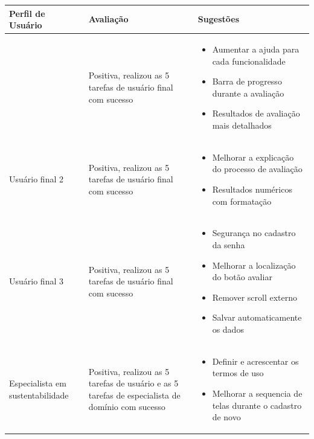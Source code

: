\begin{longtable}{|>{\centering}p{}|>{\centering}p{}|>{\centering}p{}|}
\hline 
\textbf{\small{}Perfil de Usuário} & \textbf{\small{}Avaliação} & \textbf{\small{}Sugestões}\tabularnewline
\hline 
\hline 
{\small{}Usuário final 1} & {\small{}Positiva, realizou as 5 tarefas de usuário final com sucesso} & \begin{itemize}
\item {\small{}Aumentar a ajuda para cada funcionalidade}{\small \par}
\item {\small{}Barra de progresso durante a avaliação}{\small \par}
\item {\small{}Resultados de avaliação mais detalhados}
\end{itemize}
\tabularnewline
\hline 
\hline 
{\small{}Usuário final 2} & {\small{}Positiva, realizou as 5 tarefas de usuário final com sucesso} & \begin{itemize}
\item {\small{}Melhorar a explicação do processo de avaliação}{\small \par}
\item {\small{}Resultados numéricos com formatação }
\end{itemize}
\tabularnewline
\hline 
\hline 
{\small{}Usuário final 3} & {\small{}Positiva, realizou as 5 tarefas de usuário final com sucesso} & \begin{itemize}
\item {\small{}Segurança no cadastro da senha}{\small \par}
\item {\small{}Melhorar a localização do botão avaliar}{\small \par}
\item {\small{}Remover }\foreignlanguage{english}{{\small{}scroll}}{\small{}
externo}{\small \par}
\item {\small{}Salvar automaticamente os dados}
\end{itemize}
\tabularnewline
\hline 
\hline 
{\small{}Especialista em sustentabilidade} & {\small{}Positiva, realizou as 5 tarefas de usuário e as 5 tarefas
de especialista de domínio com sucesso} & \begin{itemize}
\item {\small{}Definir e acrescentar os termos de uso}{\small \par}
\item {\small{}Melhorar a sequencia de telas durante o cadastro de novo
}
\end{itemize}
\end{longtable}
